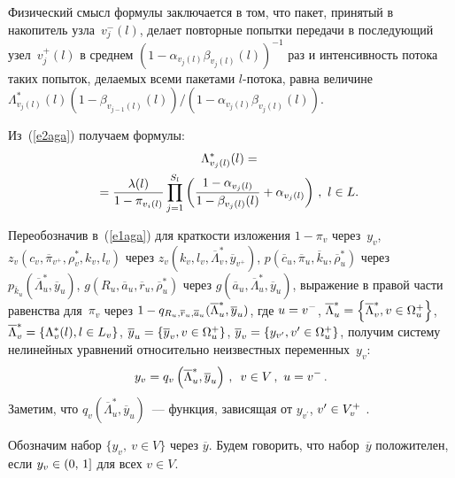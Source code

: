 \begin{multicols}{2}
   Физический смысл формулы заключается в том, что пакет, принятый в 
накопитель узла~$v_j^-(l)$, делает повторные попытки передачи в 
после\-ду\-ющий узел~$v_j^+(l)$ в среднем $(1-
\alpha_{v_j(l)}\beta_{v_j(l)}(l))^{-1}$ раз и интенсивность потока таких 
попыток, делаемых всеми пакетами $l$-потока, равна величине 
   $\Lambda^*_{v_j(l)}(l)(1-\beta_{v_{j-1}(l)}(l))/\left(1-
\alpha_{v_j(l)}\beta_{v_j(l)}(l)\right)$.
   
   Из~(\ref{e2aga}) получаем формулы:
   \begin{multline}
   \Lambda^*_{v_j(l)}(l) ={}\\
\hspace*{-2mm}{}= \fr{\lambda(l)}{1-
\pi_{v_i(l)}}\prod\limits_{j=1}^{S_l}\left( \fr{1-\alpha_{v_j(l)}}{1-
\beta_{v_j(l)}(l)}+\alpha_{v_j(l)}\right)\,,\ l\in L.
   \label{e3aga}
   \end{multline}
   
   Переобозначив в~(\ref{e1aga}) для краткости изложения $1-\pi_v$ 
через~$y_v$, $z_v\left(c_v, \overline{\pi}_{v^+}, \rho_v^*, k_v, l_v\right)$ через 
$z_v\left(k_v, l_v, \overline{\Lambda}_v^*, \overline{y}_{v^+}\right)$,
   $p\left(\overline{c}_u, \overline{\pi}_u, \overline{k}_u,\overline{\rho}_u^*\right)$ 
через $p_{\overline{k}_u}\left(\overline{\Lambda}_u^*, \overline{y}_u\right)$, $g\left(R_u, 
\overline{a}_u, \overline{r}_u, \overline{\rho}_u^*\right)$ через $g\left(\overline{a}_u, 
\overline{\Lambda}_u^*,\overline{y}_u\right)$, выражение в правой части равенства 
для~$\pi_v$ через $1\hm- q_{R_u, \overline{r}_u, 
\overline{a}_u}(\overline{\Lambda}_u^*, \overline{y}_u)$, где $u\hm=v^-$, 
$\overline{\Lambda}_u^*\hm= \left\{ \overline{\Lambda}_v^*, v\in\Omega_u^+\right\}$, 
$\overline{\Lambda}_v^*\hm=\left\{ \Lambda_v^*(l),l\in L_v\right\}$, 
$\overline{y}_u\hm= \left\{\overline{y}_v, v\in\Omega_u^+\right\}$, $\overline{y}_v\hm= 
\left\{ y_{v^\prime}, v^\prime\in\Omega_u^+\right\}$, получим систему нелинейных 
уравнений относительно неизвестных переменных~$y_v$:
   \begin{equation}
   y_v=q_v\left( \overline{\Lambda}^*_u, \overline{y}_u\right)\,,\enskip v\in 
V\,,\ u=v^-\,.
   \label{e4aga}
   \end{equation}
%
     Заметим, что $ q_v\left( \overline{\Lambda}^*_u, \overline{y}_u
     \right)$~--- функция, зависящая от $y_{v^\prime}$, $v^\prime\hm\in 
V_v^+$ .
     
     Обозначим набор $\{y_v, \ v\in V\}$ через $\overline{y}$. Будем 
говорить, что набор~$\overline{y}$ положителен, если $y_v\hm\in (0,\,1]$ для 
всех $v\in V$.
    

\end{multicols}
